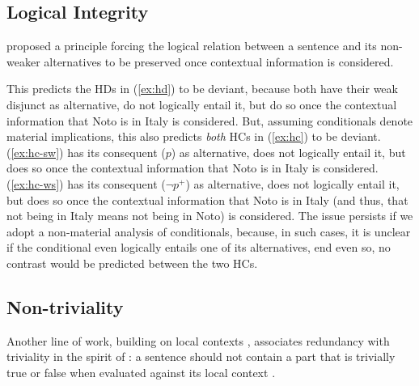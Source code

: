 \iffalse
\subsection{Logical Integrity}

\citet{Anvari2018} proposed a principle forcing the logical relation between a sentence and its non-weaker alternatives to be preserved once contextual information is considered.

\begin{exe}
\end{exe}

This predicts the HDs in (\ref{ex:hd}) to be deviant, because both have their weak disjunct as alternative, do not logically entail it, but do so once the contextual information that Noto is in Italy is considered. But, assuming conditionals denote material implications, this also predicts \textit{both} HCs in (\ref{ex:hc}) to be deviant. (\ref{ex:hc-sw}) has its consequent ($p$) as alternative, does not logically entail it, but does so once the contextual information that Noto is in Italy is considered. (\ref{ex:hc-ws}) has its consequent ($\neg p^+$) as alternative, does not logically entail it, but does so once the contextual information that Noto is in Italy (and thus, that not being in Italy means not being in Noto) is considered. 
The issue persists if we adopt a non-material analysis of conditionals, because, in such cases, it is unclear if the conditional even logically entails one of its alternatives, end even so, no contrast would be predicted between the two HCs.

\subsection{Non-triviality}
Another line of work, building on local contexts \citep{Schlenker2009}, associates redundancy with triviality in the spirit of \citep{Stalnaker1999}: a sentence should not contain a part that is trivially true or false when evaluated against its local context \citep{Mayr2016}.
\begin{exe}
	\label{ex:non-triviality}
\end{exe}

